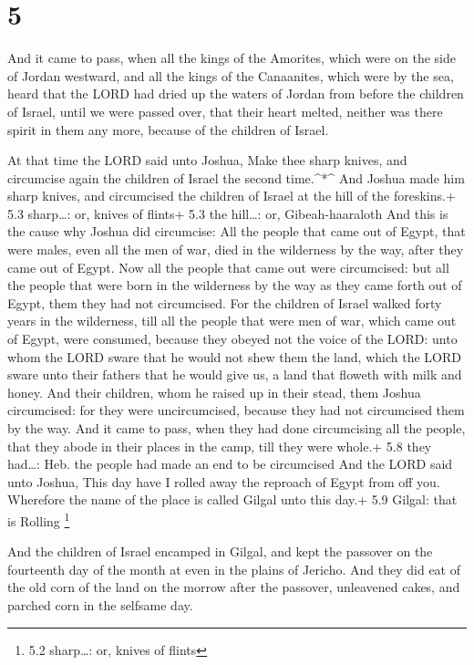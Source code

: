 \hypertarget{section-4}{%
\section{5}\label{section-4}}

 And it came to pass, when all the kings of the Amorites,
which were on the side of Jordan westward, and all the kings of the
Canaanites, which were by the sea, heard that the LORD had dried up the
waters of Jordan from before the children of Israel, until we were
passed over, that their heart melted, neither was there spirit in them
any more, because of the children of Israel.

 At that time the LORD said unto Joshua, Make thee sharp
knives, and circumcise again the children of Israel the second
time.\^{}*\^{}  And Joshua made him sharp knives, and
circumcised the children of Israel at the hill of the foreskins.+ 5.3
sharp\ldots: or, knives of flints+ 5.3 the hill\ldots: or,
Gibeah-haaraloth  And this is the cause why Joshua did
circumcise: All the people that came out of Egypt, that were males, even
all the men of war, died in the wilderness by the way, after they came
out of Egypt.  Now all the people that came out were
circumcised: but all the people that were born in the wilderness by the
way as they came forth out of Egypt, them they had not circumcised.
 For the children of Israel walked forty years in the
wilderness, till all the people that were men of war, which came out of
Egypt, were consumed, because they obeyed not the voice of the LORD:
unto whom the LORD sware that he would not shew them the land, which the
LORD sware unto their fathers that he would give us, a land that floweth
with milk and honey.  And their children, whom he raised up
in their stead, them Joshua circumcised: for they were uncircumcised,
because they had not circumcised them by the way.  And it
came to pass, when they had done circumcising all the people, that they
abode in their places in the camp, till they were whole.+ 5.8 they
had\ldots: Heb. the people had made an end to be circumcised
 And the LORD said unto Joshua, This day have I rolled away
the reproach of Egypt from off you. Wherefore the name of the place is
called Gilgal unto this day.+ 5.9 Gilgal: that is Rolling \footnote{5.2
  sharp\ldots: or, knives of flints}

 And the children of Israel encamped in Gilgal, and kept
the passover on the fourteenth day of the month at even in the plains of
Jericho.  And they did eat of the old corn of the land on
the morrow after the passover, unleavened cakes, and parched corn in the
selfsame day.

